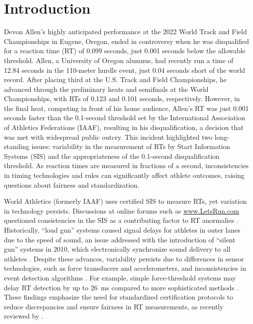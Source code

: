 \documentclass[12pt, letterpaper]{article}
\begin{document}
\doublespace


\section{Introduction}
\label{sec:intro}

Devon Allen’s highly anticipated performance at the 2022 World
Track and Field Championships in Eugene, Oregon, ended in
controversy when he was disqualified for a reaction time (RT) of
0.099 seconds, just 0.001 seconds below the allowable threshold.
Allen, a University of Oregon alumnus,
had recently run a time of 12.84 seconds in the 110-meter hurdle
event, just 0.04 seconds short of the world record. After placing
third at the U.S. Track and Field Championships, he advanced
through the preliminary heats and semifinals at the World
Championships, with RTs of 0.123 and 0.101 seconds,
respectively. However, in the final heat, competing in front of his
home audience, Allen’s RT was just 0.001 seconds faster
than the 0.1-second threshold set by the International Association
of Athletics Federations (IAAF), resulting in his disqualification, a
decision that was met with widespread public outcry. This 
incident highlighted two long-standing issues: variability in the
measurement of RTs by Start Information Systems (SIS) and the
appropriateness of the 0.1-second disqualification threshold. As
reaction times are measured in fractions of a second, inconsistencies
in timing technologies and rules can significantly affect athlete
outcomes, raising questions about fairness and standardization.


World Athletics (formerly IAAF) uses certified SIS to measure RTs, yet
variation in technology persists. Discussions at online forums such as
\url{www.LetsRun.com} questioned consistencies in the SIS as a
contributing factor to RT anormalies \citep{johnson2022data,
  johnson2022was}. Historically, ``loud gun'' systems caused signal delays
for athletes in outer lanes  due to the speed of sound, an issue
addressed with the introduction of ``silent gun'' systems in 2010,
which electronically synchronize sound delivery to all athletes
\citep{tonnessen2013reaction}. Despite these advances, variability
persists due to differences in sensor technologies, such as force
transducers and accelerometers, and inconsistencies in event detection
algorithms \citep{willwacher2013novel}. For example, simple
force-threshold systems may delay RT detection by up to 26~ms compared
to more sophisticated methods \citep{pain2007sprint}. These findings
emphasize the need for standardized certification protocols to reduce
discrepancies and ensure fairness in RT measurements, as recently
reviewed by \citet{milloz2021sprint}.
\end{document}
